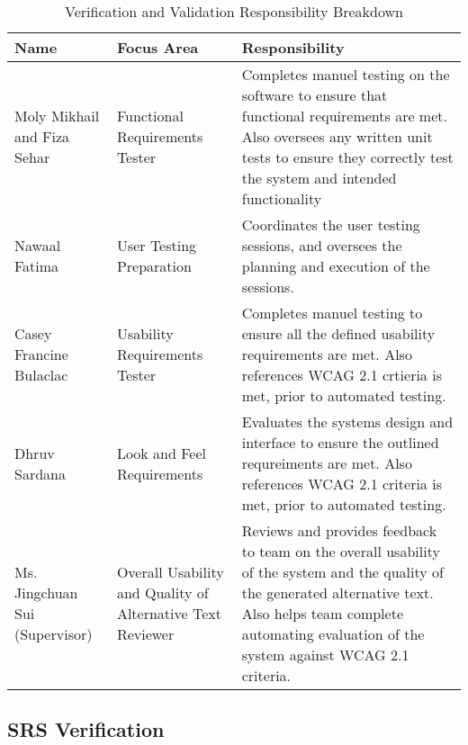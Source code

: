 \documentclass[12pt, titlepage]{article}
\begin{document}
\begin{table}[H]
  \centering
  \caption{Verification and Validation Responsibility Breakdown}
  \label{tab:data-dictionary-reading4all}
  \begin{tabular}{ |p{3.0cm}|p{3.8cm}|p{7.3cm}| }
    \hline
    \textbf{Name} & \textbf{ Focus Area } & \textbf{Responsibility} \\
    \hline
    Moly Mikhail and Fiza Sehar & Functional Requirements Tester &
    Completes manuel testing on the software to ensure that
    functional requirements are met. Also oversees any written unit
    tests to ensure they correctly test the system and intended functionality \\
    \hline
    Nawaal Fatima & User Testing Preparation & Coordinates the user
    testing sessions, and oversees the planning and execution of the
    sessions. \\
    \hline
    Casey Francine Bulaclac & Usability Requirements Tester &
    Completes manuel testing to ensure all the defined usability
    requirements are met. Also references WCAG 2.1 crtieria is met,
    prior to automated testing. \\
    \hline
    Dhruv Sardana & Look and Feel Requirements & Evaluates the
    systems design and interface to ensure the outlined requreiments
    are met. Also references WCAG 2.1 criteria is met, prior to
    automated testing. \\
    \hline
    Ms. Jingchuan Sui (Supervisor) & Overall Usability and Quality of
    Alternative Text Reviewer & Reviews and provides feedback to team
    on the overall usability of the system and the quality of the
    generated alternative text. Also helps team complete automating
    evaluation of the system against WCAG 2.1 criteria. \\
    \hline
  \end{tabular}
\end{table}

\subsection{SRS Verification}


\end{document}
